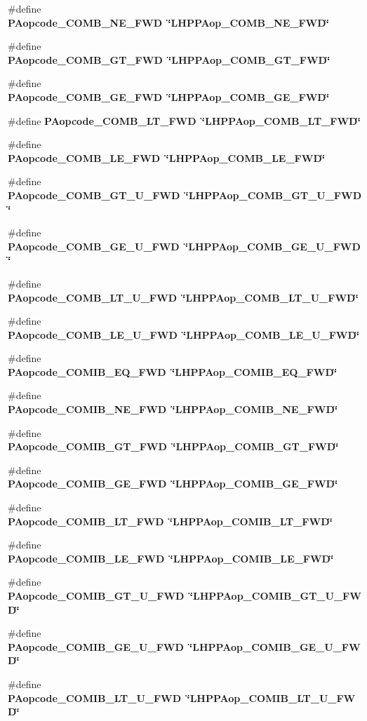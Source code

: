 \begin{CompactItemize}
\item 
\#define \bf{PAopcode\_\-COMB\_\-NE\_\-FWD}~\char`\"{}LHPPAop\_\-COMB\_\-NE\_\-FWD\char`\"{}
\item 
\#define \bf{PAopcode\_\-COMB\_\-GT\_\-FWD}~\char`\"{}LHPPAop\_\-COMB\_\-GT\_\-FWD\char`\"{}
\item 
\#define \bf{PAopcode\_\-COMB\_\-GE\_\-FWD}~\char`\"{}LHPPAop\_\-COMB\_\-GE\_\-FWD\char`\"{}
\item 
\#define \bf{PAopcode\_\-COMB\_\-LT\_\-FWD}~\char`\"{}LHPPAop\_\-COMB\_\-LT\_\-FWD\char`\"{}
\item 
\#define \bf{PAopcode\_\-COMB\_\-LE\_\-FWD}~\char`\"{}LHPPAop\_\-COMB\_\-LE\_\-FWD\char`\"{}
\item 
\#define \bf{PAopcode\_\-COMB\_\-GT\_\-U\_\-FWD}~\char`\"{}LHPPAop\_\-COMB\_\-GT\_\-U\_\-FWD\char`\"{}
\item 
\#define \bf{PAopcode\_\-COMB\_\-GE\_\-U\_\-FWD}~\char`\"{}LHPPAop\_\-COMB\_\-GE\_\-U\_\-FWD\char`\"{}
\item 
\#define \bf{PAopcode\_\-COMB\_\-LT\_\-U\_\-FWD}~\char`\"{}LHPPAop\_\-COMB\_\-LT\_\-U\_\-FWD\char`\"{}
\item 
\#define \bf{PAopcode\_\-COMB\_\-LE\_\-U\_\-FWD}~\char`\"{}LHPPAop\_\-COMB\_\-LE\_\-U\_\-FWD\char`\"{}
\item 
\#define \bf{PAopcode\_\-COMIB\_\-EQ\_\-FWD}~\char`\"{}LHPPAop\_\-COMIB\_\-EQ\_\-FWD\char`\"{}
\item 
\#define \bf{PAopcode\_\-COMIB\_\-NE\_\-FWD}~\char`\"{}LHPPAop\_\-COMIB\_\-NE\_\-FWD\char`\"{}
\item 
\#define \bf{PAopcode\_\-COMIB\_\-GT\_\-FWD}~\char`\"{}LHPPAop\_\-COMIB\_\-GT\_\-FWD\char`\"{}
\item 
\#define \bf{PAopcode\_\-COMIB\_\-GE\_\-FWD}~\char`\"{}LHPPAop\_\-COMIB\_\-GE\_\-FWD\char`\"{}
\item 
\#define \bf{PAopcode\_\-COMIB\_\-LT\_\-FWD}~\char`\"{}LHPPAop\_\-COMIB\_\-LT\_\-FWD\char`\"{}
\item 
\#define \bf{PAopcode\_\-COMIB\_\-LE\_\-FWD}~\char`\"{}LHPPAop\_\-COMIB\_\-LE\_\-FWD\char`\"{}
\item 
\#define \bf{PAopcode\_\-COMIB\_\-GT\_\-U\_\-FWD}~\char`\"{}LHPPAop\_\-COMIB\_\-GT\_\-U\_\-FWD\char`\"{}
\item 
\#define \bf{PAopcode\_\-COMIB\_\-GE\_\-U\_\-FWD}~\char`\"{}LHPPAop\_\-COMIB\_\-GE\_\-U\_\-FWD\char`\"{}
\item 
\#define \bf{PAopcode\_\-COMIB\_\-LT\_\-U\_\-FWD}~\char`\"{}LHPPAop\_\-COMIB\_\-LT\_\-U\_\-FWD\char`\"{}

\end{CompactItemize}
